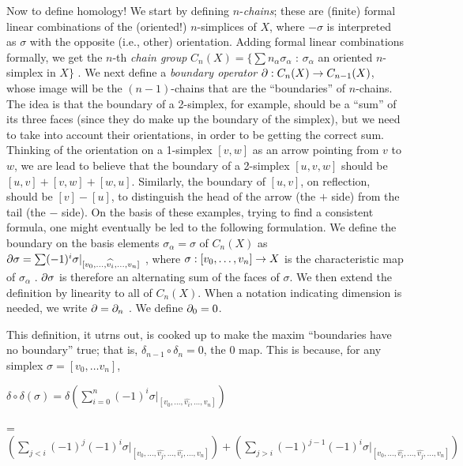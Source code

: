 \msk

Now to define homology! We start by defining $n$-{\it chains};
these are (finite) formal linear combinations of the (oriented!) $n$-simplices
of $X$, where $-\sigma$ is interpreted as $\sigma$ with the opposite
(i.e., other) orientation. Adding formal linear combinations formally,
we get the $n$-th {\it chain group} 
$C_n(X) = \{\sum n_\alpha \sigma_\alpha$ : $\sigma_\alpha$ an oriented $n$-simplex in $X\}$ .
We next define a {\it boundary operator} $\partial:C_n(X)\rightarrow C_{n-1}(X)$, whose image will be 
the $(n-1)$-chains that are the ``boundaries'' of $n$-chains. The idea is that the boundary of a 2-simplex,
for example, should be a ``sum'' of its three faces (since they do make up the boundary of the 
simplex), but we need to take into account their orientations, in order to be getting the correct
sum. Thinking of the orientation on a 1-simplex $[v,w]$ as an arrow pointing from $v$ to $w$, we are lead to 
believe that the boundary of a 2-simplex $[u,v,w]$ should be $[u,v]+[v,w]+[w,u]$. Similarly, the boundary 
of $[u,v]$, on reflection, should be $[v]-[u]$, to distinguish the head of the arrow (the $+$ side) from the
tail (the $-$ side). On the basis of these examples, trying to find a consistent formula, one might eventually
be led to the following formulation.
We define the boundary on the basis
elements $\sigma_\alpha = \sigma$ of $C_n(X)$ as
$\partial\sigma = \sum (-1)^i\sigma|_{[v_0,\ldots,\widehat{v_{i}},\ldots ,v_n]}$ , 
where $\sigma:[v_0,\ldots ,v_n]\rightarrow X$ is the characteristic map of $\sigma_\alpha$ .
$\partial\sigma$ is therefore an alternating sum of the faces of $\sigma$. 
We then extend the definition by linearity to all of $C_n(X)$. When a notation indicating
dimension is needed, we write $\partial=\partial_n$ . We define $\partial_0=0$. 

\msk

This definition, it utrns out, is cooked up to make the maxim ``boundaries have no boundary'' true;
that is, $\delta_{n-1}\circ \delta_n = 0$, the $0$ map. This is because, for any simplex
$\sigma = [v_0,\ldots v_n]$, 

\msk

$\displaystyle \delta\circ\delta(\sigma) = 
\delta(\sum_{i=0}^n  (-1)^i\sigma|_{[v_0,\ldots,\widehat{v_{i}},\ldots ,v_n]})$

= $\displaystyle (\sum_{j<i}(-1)^j(-1)^i\sigma|_{[v_0,\ldots,\widehat{v_{j}},\ldots,\widehat{v_{i}},\ldots ,v_n]})
+(\sum_{j>i}(-1)^{j-1}(-1)^i\sigma|_{[v_0,\ldots,\widehat{v_{i}},\ldots,\widehat{v_{j}},\ldots ,v_n]})$

